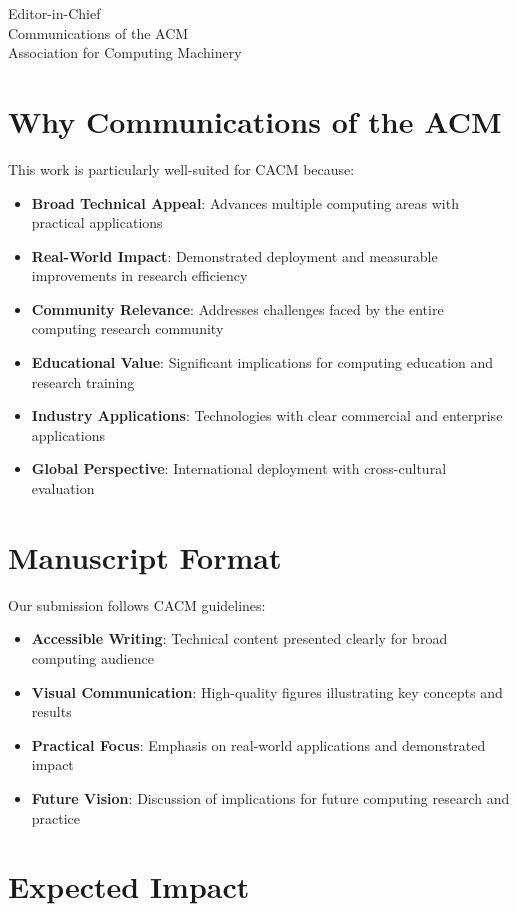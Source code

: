 \documentclass[11pt]{letter}
\begin{document}
\begin{letter}{Editor-in-Chief\\
Communications of the ACM\\
Association for Computing Machinery}
\section*{Why Communications of the ACM}

This work is particularly well-suited for CACM because:

\begin{itemize}
    \item \textbf{Broad Technical Appeal}: Advances multiple computing areas with practical applications
    \item \textbf{Real-World Impact}: Demonstrated deployment and measurable improvements in research efficiency
    \item \textbf{Community Relevance}: Addresses challenges faced by the entire computing research community
    \item \textbf{Educational Value}: Significant implications for computing education and research training
    \item \textbf{Industry Applications}: Technologies with clear commercial and enterprise applications
    \item \textbf{Global Perspective}: International deployment with cross-cultural evaluation
\end{itemize}

\section*{Manuscript Format}

Our submission follows CACM guidelines:

\begin{itemize}
    \item \textbf{Accessible Writing}: Technical content presented clearly for broad computing audience
    \item \textbf{Visual Communication}: High-quality figures illustrating key concepts and results
    \item \textbf{Practical Focus}: Emphasis on real-world applications and demonstrated impact
    \item \textbf{Future Vision}: Discussion of implications for future computing research and practice
\end{itemize}

\section*{Expected Impact}


\end{letter}
\end{document}
